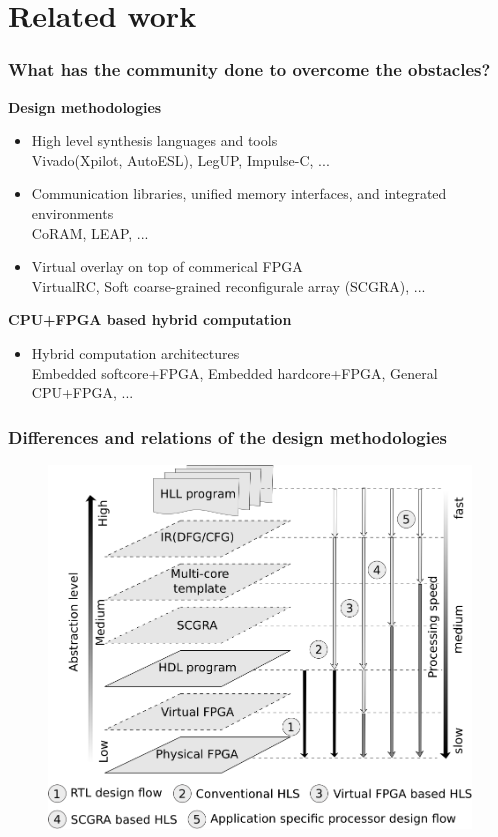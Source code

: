 \documentclass{beamer}
\begin{document}
\section{Related work}
\begin{frame}[t]
\frametitle{What has the community done to overcome the obstacles?}

\textbf{Design methodologies}
\begin{itemize}
\item High level synthesis languages and tools \\
\footnotesize
Vivado(Xpilot, AutoESL), LegUP, Impulse-C, ...
\normalsize

\item Communication libraries, unified memory interfaces, and integrated environments \\
\footnotesize
CoRAM, LEAP, ...
\normalsize

\item Virtual overlay on top of commerical FPGA \\
\footnotesize 
VirtualRC, Soft coarse-grained reconfigurale array (SCGRA), ...
\normalsize

\end{itemize}

\textbf{CPU+FPGA based hybrid computation}
\begin{itemize}
\item Hybrid computation architectures \\
\footnotesize
Embedded softcore+FPGA, Embedded hardcore+FPGA, General CPU+FPGA, ...
\normalsize
\end{itemize}

\end{frame}

\begin{frame}[t]
\frametitle{Differences and relations of the design methodologies}

\begin{figure}
  \includegraphics[width=.8\linewidth]{virtual-overlay}
\end{figure}

\end{frame}
\end{document}
